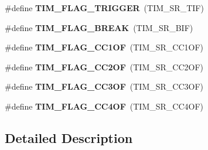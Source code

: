 \begin{DoxyCompactItemize}
\#define {\bfseries T\+I\+M\+\_\+\+F\+L\+A\+G\+\_\+\+T\+R\+I\+G\+G\+ER}~(T\+I\+M\+\_\+\+S\+R\+\_\+\+T\+IF)
\item 
\mbox{\label{group___t_i_m___flag__definition_ga01aedbe0676064a4d47dee474ddb863d}} 
\#define {\bfseries T\+I\+M\+\_\+\+F\+L\+A\+G\+\_\+\+B\+R\+E\+AK}~(T\+I\+M\+\_\+\+S\+R\+\_\+\+B\+IF)
\item 
\mbox{\label{group___t_i_m___flag__definition_ga38dfb7d1ed00af77d70bc3be28500108}} 
\#define {\bfseries T\+I\+M\+\_\+\+F\+L\+A\+G\+\_\+\+C\+C1\+OF}~(T\+I\+M\+\_\+\+S\+R\+\_\+\+C\+C1\+OF)
\item 
\mbox{\label{group___t_i_m___flag__definition_ga4df0c71d3e695c214d49802942e04590}} 
\#define {\bfseries T\+I\+M\+\_\+\+F\+L\+A\+G\+\_\+\+C\+C2\+OF}~(T\+I\+M\+\_\+\+S\+R\+\_\+\+C\+C2\+OF)
\item 
\mbox{\label{group___t_i_m___flag__definition_gac81f24eaffdf83c2db9d2e6078a00919}} 
\#define {\bfseries T\+I\+M\+\_\+\+F\+L\+A\+G\+\_\+\+C\+C3\+OF}~(T\+I\+M\+\_\+\+S\+R\+\_\+\+C\+C3\+OF)
\item 
\mbox{\label{group___t_i_m___flag__definition_gafc8b04654766d98ba2c6fed601895a20}} 
\#define {\bfseries T\+I\+M\+\_\+\+F\+L\+A\+G\+\_\+\+C\+C4\+OF}~(T\+I\+M\+\_\+\+S\+R\+\_\+\+C\+C4\+OF)
\end{DoxyCompactItemize}


\subsection{Detailed Description}
